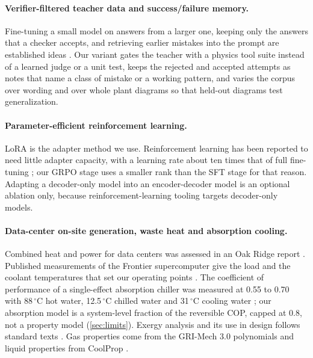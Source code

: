 \paragraph{Verifier-filtered teacher data and success/failure memory.}
Fine-tuning a small model on answers from a larger one, keeping only the answers that a checker accepts, and retrieving earlier mistakes into the prompt are established ideas
. Our variant gates the teacher with a physics tool suite instead of a learned judge or a unit test,
keeps the rejected and accepted attempts as notes that name a class of mistake or a working pattern, and varies the corpus over wording and over whole plant diagrams so that held-out diagrams test generalization.

\paragraph{Parameter-efficient reinforcement learning.}
LoRA \citep{hu2021lora} is the adapter method we use. Reinforcement learning has been reported to need little adapter capacity, with a learning
rate about ten times that of full fine-tuning \citep{schulman2025lora}; our GRPO stage uses a smaller
rank than the SFT stage for that reason. Adapting a decoder-only model into an encoder-decoder model
\citep{zhang2025t5gemma} is an optional ablation only, because reinforcement-learning tooling
targets decoder-only models.

\paragraph{Data-center on-site generation, waste heat and absorption cooling.}
Combined heat and power for data centers was assessed in an Oak Ridge report \citep{darrow2009chp}.
Published measurements of the Frontier supercomputer give the load and the coolant temperatures that
set our operating points \citep{sun2024frontier,jadhav2026frontierml}. The coefficient of performance
of a single-effect absorption chiller was measured at 0.55 to 0.70 with 88\,$^\circ$C hot water,
12.5\,$^\circ$C chilled water and 31\,$^\circ$C cooling water \citep{ochoa2019absorption}; our
absorption model is a system-level fraction of the reversible COP, capped at 0.8, not a property model
(\cref{sec:limits}). Exergy analysis and its use in design follows standard texts \citep{bejan1996thermal}.
Gas properties come from the GRI-Mech 3.0 polynomials \citep{smith1999grimech} and liquid properties
from CoolProp \citep{bell2014coolprop}.

